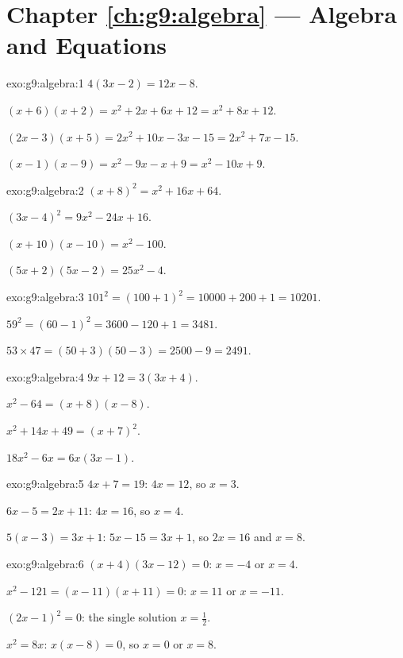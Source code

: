 \section*{Chapter \ref{ch:g9:algebra} --- Algebra and Equations}

\begin{solution}{exo:g9:algebra:1}
$4(3x - 2) = 12x - 8$.

$(x+6)(x+2) = x^2 + 2x + 6x + 12 = x^2 + 8x + 12$.

$(2x-3)(x+5) = 2x^2 + 10x - 3x - 15 = 2x^2 + 7x - 15$.

$(x-1)(x-9) = x^2 - 9x - x + 9 = x^2 - 10x + 9$.
\end{solution}

\begin{solution}{exo:g9:algebra:2}
$(x+8)^2 = x^2 + 16x + 64$.

$(3x-4)^2 = 9x^2 - 24x + 16$.

$(x+10)(x-10) = x^2 - 100$.

$(5x+2)(5x-2) = 25x^2 - 4$.
\end{solution}

\begin{solution}{exo:g9:algebra:3}
$101^2 = (100+1)^2 = 10000 + 200 + 1 = 10201$.

$59^2 = (60-1)^2 = 3600 - 120 + 1 = 3481$.

$53 \times 47 = (50+3)(50-3) = 2500 - 9 = 2491$.
\end{solution}

\begin{solution}{exo:g9:algebra:4}
$9x + 12 = 3(3x + 4)$.

$x^2 - 64 = (x+8)(x-8)$.

$x^2 + 14x + 49 = (x+7)^2$.

$18x^2 - 6x = 6x(3x - 1)$.
\end{solution}

\begin{solution}{exo:g9:algebra:5}
$4x + 7 = 19$: $4x = 12$, so $x = 3$.

$6x - 5 = 2x + 11$: $4x = 16$, so $x = 4$.

$5(x-3) = 3x + 1$: $5x - 15 = 3x + 1$, so $2x = 16$ and $x = 8$.
\end{solution}

\begin{solution}{exo:g9:algebra:6}
$(x+4)(3x-12) = 0$: $x = -4$ or $x = 4$.

$x^2 - 121 = (x-11)(x+11) = 0$: $x = 11$ or $x = -11$.

$(2x-1)^2 = 0$: the single solution $x = \frac12$.

$x^2 = 8x$: $x(x - 8) = 0$, so $x = 0$ or $x = 8$.
\end{solution}

